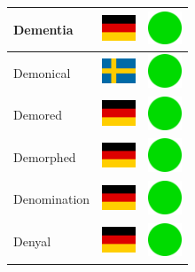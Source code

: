 \documentclass[12pt, a4paper, twoside]{report}
\begin{document}
\begin{center}
\begin{longtable}{|p{5cm}|p{2cm}|p{2cm}|}
 Dementia                                                   & \includegraphics[width=1cm]{../img/flags/de} &   \includegraphics[width=1cm]{../likes/y} \\ \hline
 Demonical                                                  & \includegraphics[width=1cm]{../img/flags/se} &   \includegraphics[width=1cm]{../likes/y} \\ \hline
 Demored                                                    & \includegraphics[width=1cm]{../img/flags/de} &   \includegraphics[width=1cm]{../likes/y} \\ \hline
 Demorphed                                                  & \includegraphics[width=1cm]{../img/flags/de} &   \includegraphics[width=1cm]{../likes/y} \\ \hline
 Denomination                                               & \includegraphics[width=1cm]{../img/flags/de} &   \includegraphics[width=1cm]{../likes/y} \\ \hline
 Denyal                                                     & \includegraphics[width=1cm]{../img/flags/de} &   \includegraphics[width=1cm]{../likes/y} \\ \hline

\end{longtable}
\end{center}
\end{document}
